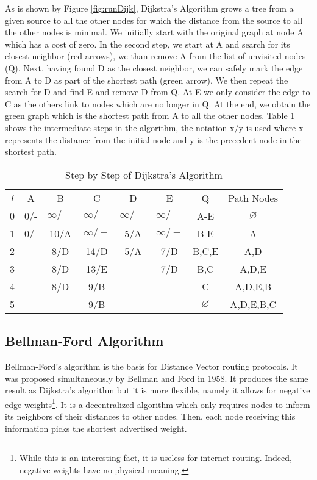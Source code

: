 As is shown by Figure \ref{fig:runDijk}, Dijkstra's Algorithm grows a tree from a given source to all the other nodes for which the distance from the source to all the other nodes is minimal. We initially start with the original graph at node A which has a cost of zero. In the second step, we start at A and search for its closest neighbor (red arrows), we than remove A from the list of unvisited nodes (Q). Next, having found D as the closest neighbor, we can safely mark the edge from A to D as part of the shortest path (green arrow). We then repeat the search for D and find E and remove D from Q. At E we only consider the edge to C as the others link to nodes which are no longer in Q. At the end, we obtain the green graph which is the shortest path from A to all the other nodes. Table \ref{tab:runDijk} shows the intermediate steps in the algorithm, the notation x/y is used where x represents the distance from the initial node and y is the precedent node in the shortest path.

\begin{table}[!htbp]
\begin{center}
\begin{tabular}[]{|c|c|c|c|c|c|c|c|}
$I$ & A   & B          & C          & D          & E         & Q  & Path Nodes \\
0   & 0/- & $\infty/-$ & $\infty/-$ & $\infty/-$ &$\infty/-$ & A-E & $\varnothing$ \\
1   & 0/- & 10/A 	     & $\infty/-$ & 5/A        &$\infty/-$ & B-E & A \\
2   & 	& 8/D 	     & 14/D 	  & 5/A        & 7/D 	   & B,C,E & A,D \\
3   & 	& 8/D 	     & 13/E 	  & 	       & 7/D 	   & B,C & A,D,E \\
4   & 	& 8/D 	     & 9/B 	  & 	       & 	   & C & A,D,E,B \\
5   & 	& 	     	     & 9/B 	  & 	       & 	   & $ \varnothing $ & A,D,E,B,C
\end{tabular}
\end{center}
\caption{Step by Step of Dijkstra's Algorithm}
\label{tab:runDijk}
\end{table}

\subsection{Bellman-Ford Algorithm}

 Bellman-Ford's algorithm \cite{Bellman1958} is the basis for Distance Vector routing protocols. It was proposed simultaneously by Bellman and Ford in 1958. It produces the same result as Dijkstra's algorithm but it is more flexible, namely it allows for negative edge weights\footnote{While this is an interesting fact, it is useless for internet routing. Indeed, negative weights have no physical meaning.}. It is a decentralized algorithm which only requires nodes to inform its neighbors of their distances to other nodes. Then, each node receiving this information picks the shortest advertised weight. 

